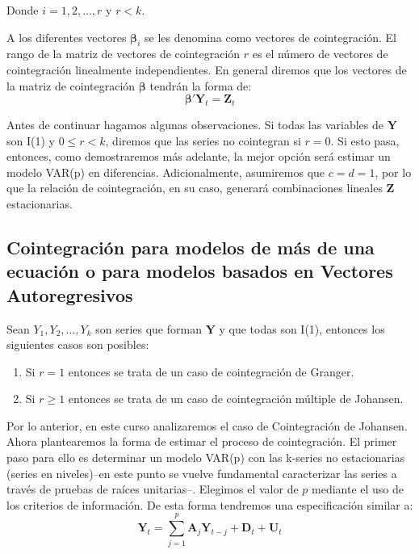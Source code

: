 \documentclass[
]{book}
\begin{document}
Donde \(i = 1, 2, \ldots, r\) y \(r < k\).

A los diferentes vectores \(\boldsymbol{\beta}_i\) se les denomina como
vectores de cointegración. El rango de la matriz de vectores de
cointegración \(r\) es el número de vectores de cointegración linealmente
independientes. En general diremos que los vectores de la matriz de
cointegración \(\boldsymbol{\beta}\) tendrán la forma de: \begin{equation}
    \boldsymbol{\beta}' \mathbf{Y}_t = \mathbf{Z}_t
\end{equation}

Antes de continuar hagamos algunas observaciones. Si todas las variables
de \(\mathbf{Y}\) son I(1) y \(0 \leq r < k\), diremos que las series no
cointegran si \(r = 0\). Si esto pasa, entonces, como demostraremos más
adelante, la mejor opción será estimar un modelo VAR(p) en diferencias.
Adicionalmente, asumiremos que \(c = d = 1\), por lo que la relación de
cointegración, en su caso, generará combinaciones lineales \(\mathbf{Z}\)
estacionarias.

\hypertarget{cointegraciuxf3n-para-modelos-de-muxe1s-de-una-ecuaciuxf3n-o-para-modelos-basados-en-vectores-autoregresivos}{%
\subsection{Cointegración para modelos de más de una ecuación o para modelos basados en Vectores Autoregresivos}\label{cointegraciuxf3n-para-modelos-de-muxe1s-de-una-ecuaciuxf3n-o-para-modelos-basados-en-vectores-autoregresivos}}

Sean \(Y_1, Y_2, \ldots, Y_k\) son series que forman \(\mathbf{Y}\) y que
todas son I(1), entonces los siguientes casos son posibles:

\begin{enumerate}
\def\labelenumi{\arabic{enumi}.}
\item
  Si \(r = 1\) entonces se trata de un caso de cointegración de Granger.
\item
  Si \(r \geq 1\) entonces se trata de un caso de cointegración múltiple
  de Johansen.
\end{enumerate}

Por lo anterior, en este curso analizaremos el caso de Cointegración de
Johansen. Ahora plantearemos la forma de estimar el proceso de
cointegración. El primer paso para ello es determinar un modelo VAR(p)
con las k-series no estacionarias (series en niveles)--en este punto se
vuelve fundamental caracterizar las series a través de pruebas de raíces
unitarias--. Elegimos el valor de \(p\) mediante el uso de los criterios
de información. De esta forma tendremos una especificación similar a:
\begin{equation}
    \mathbf{Y}_t = \sum_{j=1}^p \mathbf{A}_j \mathbf{Y}_{t-j} + \mathbf{D}_t + \mathbf{U}_t
    \label{eq:VARCI}
\end{equation}
\end{document}
